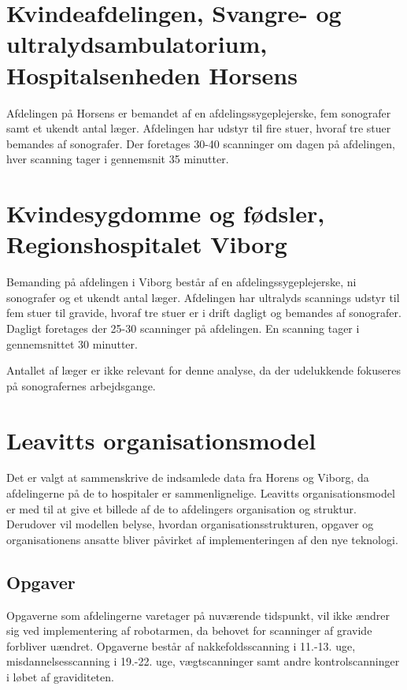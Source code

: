 \section{Kvindeafdelingen, Svangre- og ultralydsambulatorium, Hospitalsenheden Horsens}
Afdelingen på Horsens er bemandet af en afdelingssygeplejerske, fem sonografer samt et ukendt antal læger. Afdelingen har udstyr til fire stuer, hvoraf tre stuer bemandes af sonografer. Der foretages 30-40 scanninger om dagen på afdelingen, hver scanning tager i gennemsnit 35 minutter.

\section{Kvindesygdomme og fødsler, Regionshospitalet Viborg}
Bemanding på afdelingen i Viborg består af en afdelingssygeplejerske, ni sonografer og et ukendt antal læger. Afdelingen har ultralyds scannings udstyr til fem stuer til gravide, hvoraf tre stuer er i drift dagligt og bemandes af sonografer. Dagligt foretages der 25-30 scanninger på afdelingen. En scanning tager i gennemsnittet 30 minutter.

Antallet af læger er ikke relevant for denne analyse, da der udelukkende fokuseres på sonografernes arbejdsgange.

\section{Leavitts organisationsmodel}
Det er valgt at sammenskrive de indsamlede data fra Horens og Viborg, da afdelingerne på de to hospitaler er sammenlignelige. Leavitts organisationsmodel er med til at give et billede af de to afdelingers organisation og struktur. Derudover vil modellen belyse, hvordan organisationsstrukturen, opgaver og organisationens ansatte bliver påvirket af implementeringen af den nye teknologi.


\subsection{Opgaver}
Opgaverne som afdelingerne varetager på nuværende tidspunkt, vil ikke ændrer sig ved implementering af robotarmen, da behovet for scanninger af gravide forbliver uændret. Opgaverne består af nakkefoldsscanning i 11.-13. uge, misdannelsesscanning i 19.-22. uge, vægtscanninger samt andre kontrolscanninger i løbet af graviditeten. 

